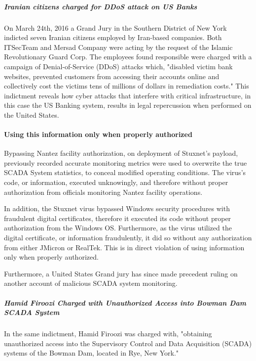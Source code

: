 \documentclass[12pt]{article}
\begin{document}
\begin{multicols}{2}
\subparagraph{Iranian citizens charged for DDoS attack on US Banks}

On March 24th, 2016 a Grand Jury in the Southern District of New York indicted seven Iranian citizens employed by Iran-based companies. Both ITSecTeam and Mersad Company were acting by the request of the Islamic Revolutionary Guard Corp. The employees found responsible were charged with a campaign of Denial-of-Service (DDoS) attacks which, "disabled victim bank websites, prevented customers from accessing their accounts online and collectively cost the victims tens of millions of dollars in remediation costs."\cite{sevenIraniansIndicted} This indictment reveals how cyber attacks that interfere with critical infrastructure, in this case the US Banking system, results in legal repercussion when performed on the United States.

\paragraph{Using this information only when properly authorized}

Bypassing Nantez facility authorization, on deployment of Stuxnet's payload, previously recorded accurate monitoring metrics were used to overwrite the true SCADA System statistics, to conceal modified operating conditions.\cite{theRealStoryOfStuxnet} The virus's code, or information, executed unknowingly, and therefore without proper authorization from officials monitoring Nantez facility operations.

In addition, the Stuxnet virus bypassed Windows security procedures with fraudulent digital certificates, therefore it executed its code without proper authorization from the Windows OS. Furthermore, as the virus utilized the digital certificate, or information fraudulently, it did so without any authorization from either JMicron or RealTek.\cite{signedUsingCertificates} This is in direct violation of using information only when properly authorized.

Furthermore, a United States Grand jury has since made precedent ruling on another account of malicious SCADA system monitoring.

\subparagraph{Hamid Firoozi Charged with Unauthorized Access into Bowman Dam SCADA System}

In the same indictment, Hamid Firoozi was charged with, "obtaining unauthorized access into the Supervisory Control and Data Acquisition (SCADA) systems of the Bowman Dam, located in Rye, New York."\cite{sevenIraniansIndicted}


\end{multicols}
\end{document}
